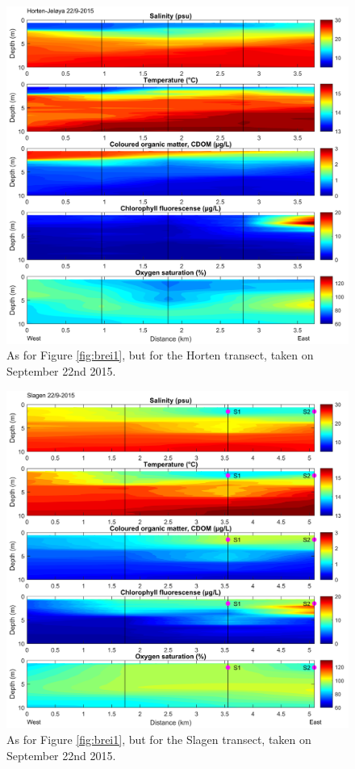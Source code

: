 \documentclass[12pt,a4paper,english]{article}
\begin{document}
\begin{figure}[ht]
\centerline{
\includegraphics*[width=\textwidth]{Figurer/Horten_22_09_2015_v2.png}}
\caption{\small
As for Figure \ref{fig:brei1}, but for the Horten transect, taken on September 22nd 2015.}
\label{fig:horten}
\end{figure}

\begin{figure}[ht]
\centerline{
\includegraphics*[width=\textwidth]{Figurer/Slagen_22_09_2015_v2.png}}
\caption{\small
As for Figure \ref{fig:brei1}, but for the Slagen transect, taken on September 22nd 2015.}
\label{fig:slagen}
\end{figure}
\end{document}
